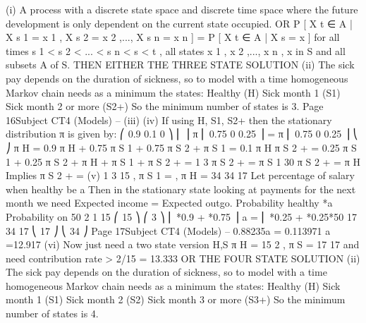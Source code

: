 (i)
A process with a discrete state space and discrete time space
where the future development is only dependent on the current state occupied.
OR
P [ X t ∈ A | X s 1 = x 1 , X s 2 = x 2 ,..., X s n = x n ] = P [ X t ∈ A | X s = x ]
for all times s 1 < s 2 < ... < s n < s < t , all states x 1 , x 2 ,..., x n , x in S and all
subsets A of S.
THEN EITHER THE THREE STATE SOLUTION
(ii)
The sick pay depends on the duration of sickness, so to model with a time
homogeneous Markov chain needs as a minimum the states:
Healthy (H)
Sick month 1 (S1)
Sick month 2 or more (S2+)
So the minimum number of states is 3.
Page 16Subject CT4 (Models) – %
(iii)
(iv)
If using H, S1, S2+ then the stationary distribution π is given by:
⎛ 0.9 0.1 0 ⎞
⎜
⎟
π ⎜ 0.75 0 0.25 ⎟ = π
⎜ 0.75 0 0.25 ⎟
⎝
⎠
π H = 0.9 π H + 0.75 π S 1 + 0.75 π S 2 +
π S 1 = 0.1 π H
π S 2 + = 0.25 π S 1 + 0.25 π S 2 +
π H + π S 1 + π S 2 + = 1
3 π S 2 + = π S 1
30 π S 2 + = π H
Implies
π S 2 + =
(v)
1
3
15
, π S 1 = , π H =
34
34
17
Let percentage of salary when healthy be a%
Then in the stationary state looking at payments for the next month we need
Expected income = Expected outgo.
Probability healthy *a%
Probability on 50%
2
1
15
⎛ 15
⎞
⎛ 3
⎞
⎜ *0.9 + *0.75 ⎟ a = ⎜ *0.25 + *0.25*50%
17
34
17
⎝ 17
⎠
⎝ 34
⎠
Page 17Subject CT4 (Models) – %
0.88235a = 0.113971
a =12.917%
(vi)
Now just need a two state version {H,S}
π H =
15
2
, π S =
17
17
and need contribution rate > 2/15 = 13.333%
OR THE FOUR STATE SOLUTION
(ii)
The sick pay depends on the duration of sickness, so to model with a time
homogeneous Markov chain needs as a minimum the states:
Healthy (H)
Sick month 1 (S1)
Sick month 2 (S2)
Sick month 3 or more (S3+)
So the minimum number of states is 4.

